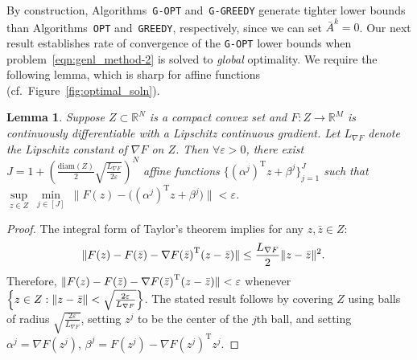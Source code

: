 \documentclass{article}
\newcommand{\tr}[1]{\ensuremath{{#1}^\text{T}}}
\newcommand{\uset}[2]{\ensuremath{\underset{#1}{#2}}}
\DeclarePairedDelimiter\norm{\lVert}{\rVert}%
\newcommand{\R}{\mathbb{R}}
\newcommand{\1}[1]{\mathds{1}\left[#1\right]}
\newtheorem{lemma}[theorem]{Lemma}
\begin{document}
By construction, Algorithms~\texttt{G-OPT} and~\texttt{G-GREEDY} generate tighter lower bounds than Algorithms~\texttt{OPT} and~\texttt{GREEDY}, respectively, since we can set $\bar{A}^k = 0$.
Our next result establishes rate of convergence of the \texttt{G-OPT} lower bounds when problem~\eqref{eqn:genl_method-2} is solved to \textit{global} optimality.
We require the following lemma, which is sharp for affine functions (cf.\ Figure~\ref{fig:optimal_soln}).


\begin{lemma}
\label{lem:pwlest}
Suppose $Z \subset \R^N$ is a compact convex set and $F: Z \to \mathbb{R}^M$ is continuously differentiable with a Lipschitz continuous gradient.
Let $L_{\nabla F}$ denote the Lipschitz constant of $\nabla F$ on $Z$.
Then $\forall \varepsilon > 0$, there exist $J = 1+\left(\frac{\text{diam}(Z)}{2}\sqrt{\frac{L_{\nabla F}}{2\varepsilon}}\right)^N$ affine functions $\{ \tr{(\alpha^j)} z + \beta^j \}_{j=1}^{J}$ such that $\uset{z \in Z}{\sup} \: \uset{j \in [J]}{\min} \: \big\lVert F(z) - \bigl(\tr{(\alpha^j)} z + \beta^j \bigr) \big\rVert < \varepsilon$.
\end{lemma}
\begin{proof}
The integral form of Taylor's theorem implies for any $z, \bar{z} \in Z$:
\begin{align*}
\norm{F(z) - F(\bar{z}) - \tr{\nabla F(\bar{z})} (z - \bar{z})} &\leq \frac{L_{\nabla F}}{2} \norm{z - \bar{z}}^2.
\end{align*}
Therefore, $\norm{F(z) - F(\bar{z}) - \tr{\nabla F(\bar{z})} (z - \bar{z})} < \varepsilon$ whenever $\Big\{z \in Z : \norm{z - \bar{z}} < \sqrt{\frac{2\varepsilon}{L_{\nabla F}}}\Big\}$.
The stated result follows by covering $Z$ using balls of radius $\sqrt{\frac{2\varepsilon}{L_{\nabla F}}}$, setting $z^j$ to be the center of the $j$th ball, and setting $\alpha^j = \nabla F(z^j)$, $\beta^j = F(z^j) - \tr{\nabla F(z^j)} z^j$.
\end{proof}
\end{document}
